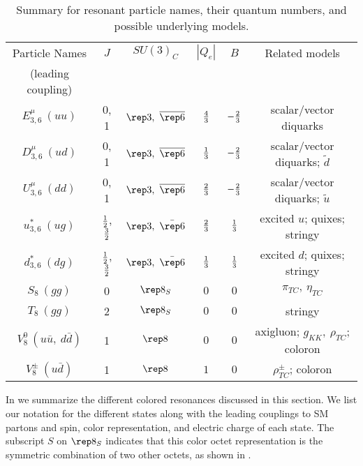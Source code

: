 \begin{table}[tb]
\caption{Summary for resonant particle names, their quantum numbers,
and possible underlying models.}
\begin{center}
\begin{tabular}{|c|c|c|c|c|c|}  \hline
 Particle Names & $J$  & $SU(3)_{C}$  & $|Q_{e}|$ & $B$ & Related models \\
 (leading coupling) &  &  &  &  &  \\ \hline
$E_{3,6}^{\mu}\ (uu)$       &0, 1& ${\rep3},\ \overline{\rep6}$ &
$4\over3$ & $ -{2\over3} $ & scalar/vector diquarks \\ \hline
$D_{3,6}^{\mu}\ (ud)$       &0, 1& ${\rep3}, \ \overline{\rep6}$ &
$1\over3$ & $ -{2\over3} $ & scalar/vector diquarks; ${\tilde d}$ \\
\hline $U_{3,6}^{\mu}\ (dd)$       &0, 1& ${\rep3},\
\overline{\rep6}$ & $2\over3$ & $ -{2\over3} $ & scalar/vector
diquarks; $\tilde u$ \\  \hline\hline
 $u^{*}_{3,6}\ (ug)$ &$1\over2$, $3\over2$& $\rep3,\ \bar{\rep6}$ & ${2\over 3}$ & $ {1\over3} $ & excited $u$;
 quixes; stringy \\ \hline
  $d^{*}_{3,6}\ (dg)$ &$1\over2$, $3\over2$& $\rep3,\ \bar{\rep6}$ & ${1\over 3}$ & $ {1\over3} $ & excited $d$;
 quixes; stringy \\  \hline\hline
 $S_{8}\ (gg)$   &0& $\rep8_{S}$ &  $0$ & $0$ & $\pi_{TC},\ \eta_{TC} $ \\ \hline
  $T_{8}\ (gg)$   &2& $\rep8_{S}$ &  $0$ & $0$ & stringy \\ \hline \hline
  $V^{0}_{8}\ (u\bar u,\ d\bar d)$      &1& $\rep8$          &  $0$   & $ 0 $  & axigluon; $g^{}_{KK},\ \rho_{TC}$; coloron \\ \hline
  $V_8^{\pm}\ (u\bar d)$  &1& $\rep8$          &  $1$   & $ 0 $  & $\rho^{\pm}_{TC}$; coloron \\ \hline
\end{tabular}
\end{center}
\label{tab:qnum}
\end{table}

In  we summarize the different colored resonances discussed in this section. We list our notation for the different states along with the leading couplings to SM partons and spin, color representation, and electric charge of each state.  The subscript $S$ on $\rep8_S$ indicates that this color octet representation is the symmetric combination of two other octets, as shown in .


